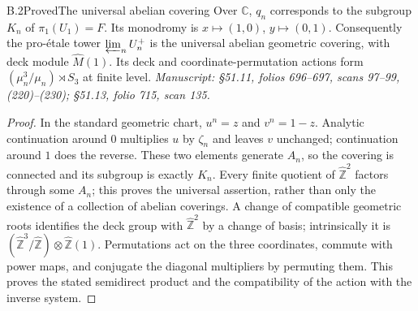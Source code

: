 \begin{statement}{B.2}{Proved}{The universal abelian covering}
Over \(\mathbb C\), \(q_n\) corresponds to the subgroup \(K_n\) of
\(\pi_1(U_1)=F\). Its monodromy is \(x\mapsto(1,0)\),
\(y\mapsto(0,1)\). Consequently the pro-\'etale tower
\(\varprojlim_n U_n^+\) is the universal abelian geometric covering, with
deck module \(\widehat M(1)\). Its deck and coordinate-permutation
actions form \((\mu_n^3/\mu_n)\rtimes S_3\) at finite level.
\emph{Manuscript: \S51.11, folios 696--697, scans 97--99, (220)--(230);
\S51.13, folio 715, scan 135.}
\end{statement}
\begin{proof}
In the standard geometric chart, \(u^n=z\) and \(v^n=1-z\). Analytic
continuation around \(0\) multiplies \(u\) by \(\zeta_n\) and leaves \(v\)
unchanged; continuation around \(1\) does the reverse. These two elements
generate \(A_n\), so the covering is connected and its subgroup is exactly
\(K_n\). Every finite quotient of \(\widehat{\mathbb Z}^2\) factors through
some \(A_n\); this proves the universal assertion, rather than only the
existence of a collection of abelian coverings. A change of compatible
geometric roots identifies the deck group with \(\widehat{\mathbb Z}^2\)
by a change of basis; intrinsically it is
\((\widehat{\mathbb Z}^3/\widehat{\mathbb Z})\otimes
\widehat{\mathbb Z}(1)\). Permutations act on the three coordinates,
commute with power maps, and conjugate the diagonal multipliers by
permuting them. This proves the stated semidirect product and the
compatibility of the action with the inverse system.
\end{proof}

